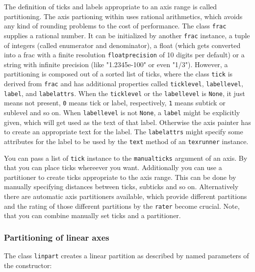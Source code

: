 The definition of ticks and labels appropriate to an axis range is
called partitioning. The axis partioning within \PyX{} uses rational
arithmetics, which avoids any kind of rounding problems to the cost of
performance. The class \verb|frac| supplies a rational number. It can
be initialized by another \verb|frac| instance, a tuple of integers
(called enumerator and denominator), a float (which gets converted
into a frac with a finite resolution \verb|floatprecision| of 10
digits per default) or a string with infinite precision (like
"1.2345e-100" or even "1/3"). However, a partitioning is composed out
of a sorted list of ticks, where the class \verb|tick| is derived from
\verb|frac| and has additional properties called \verb|ticklevel|,
\verb|labellevel|, \verb|label|, and \verb|labelattrs|. When the
\verb|ticklevel| or the \verb|labellevel| is \verb|None|, it just
means not present, \verb|0| means tick or label, respectively,
\verb|1| means subtick or sublevel and so on. When \verb|labellevel|
is not \verb|None|, a \verb|label| might be explicitly given, which
will get used as the text of that label. Otherwise the axis painter
has to create an appropriate text for the label. The \verb|labelattrs|
might specify some attributes for the label to be used by the
\verb|text| method of an \verb|texrunner| instance.

You can pass a list of \verb|tick| instance to the \verb|manualticks|
argument of an axis. By that you can place ticks whereever you want.
Additionally you can use a partitioner to create ticks appropriate to
the axis range. This can be done by manually specifying distances
between ticks, subticks and so on. Alternatively there are automatic
axis partitioners available, which provide different partitions and
the rating of those different partitions by the \verb|rater| become
crucial. Note, that you can combine manually set ticks and a
partitioner.

\subsubsection{Partitioning of linear axes}

The class \verb|linpart| creates a linear partition as described by
named parameters of the constructor:

